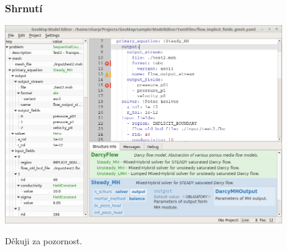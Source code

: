 \begin{frame}
	\frametitle{Shrnutí}
	\vspace{-5pt}
	\includegraphics[width=0.9\textwidth]{img/gui.png}\\
\end{frame}

\begin{frame}{}{}
\begin{center}
\huge Děkuji za pozornost.
\end{center}
\end{frame}



